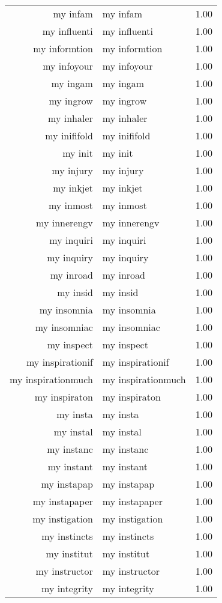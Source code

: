 \begin{table}[ht]
\begin{tabular}{rlr}
  my infam & my infam & 1.00 \\ 
  my influenti & my influenti & 1.00 \\ 
  my informtion & my informtion & 1.00 \\ 
  my infoyour & my infoyour & 1.00 \\ 
  my ingam & my ingam & 1.00 \\ 
  my ingrow & my ingrow & 1.00 \\ 
  my inhaler & my inhaler & 1.00 \\ 
  my inififold & my inififold & 1.00 \\ 
  my init & my init & 1.00 \\ 
  my injury & my injury & 1.00 \\ 
  my inkjet & my inkjet & 1.00 \\ 
  my inmost & my inmost & 1.00 \\ 
  my innerengv & my innerengv & 1.00 \\ 
  my inquiri & my inquiri & 1.00 \\ 
  my inquiry & my inquiry & 1.00 \\ 
  my inroad & my inroad & 1.00 \\ 
  my insid & my insid & 1.00 \\ 
  my insomnia & my insomnia & 1.00 \\ 
  my insomniac & my insomniac & 1.00 \\ 
  my inspect & my inspect & 1.00 \\ 
  my inspirationif & my inspirationif & 1.00 \\ 
  my inspirationmuch & my inspirationmuch & 1.00 \\ 
  my inspiraton & my inspiraton & 1.00 \\ 
  my insta & my insta & 1.00 \\ 
  my instal & my instal & 1.00 \\ 
  my instanc & my instanc & 1.00 \\ 
  my instant & my instant & 1.00 \\ 
  my instapap & my instapap & 1.00 \\ 
  my instapaper & my instapaper & 1.00 \\ 
  my instigation & my instigation & 1.00 \\ 
  my instincts & my instincts & 1.00 \\ 
  my institut & my institut & 1.00 \\ 
  my instructor & my instructor & 1.00 \\ 
  my integrity & my integrity & 1.00 \\ 

\end{tabular}
\end{table}

